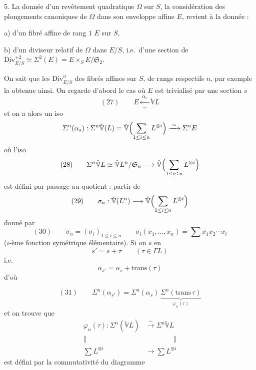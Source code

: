 \documentclass[11pt,a4paper]{article}
\begin{document}
5. La donnée d'un revêtement quadratique $\Omega$ sur $S$,  la considération des plongements canoniques de $\Omega$ dans son enveloppe affine $E$, revient à la donnée :

a) d'un fibré affine de rang $1$ $E$ sur $S$,

b) d'un diviseur relatif de $\Omega$ dans $E/S$, i.e.\ d'une section de $\underline{\mathrm{Div}}^{+2}_{E/S} \simeq \Sigma^2(E) = E \times_S E/\mathfrak{S}_2$.

On sait que \struck{\ill{}} les $\underline{\mathrm{Div}}^{n}_{E/S}$   des fibrés affines sur $S$, de rangs respectifs $n$,  par exemple la  obtenue ainsi. On regarde d'abord le cas où $E$ est trivialisé par une section $s$
\[
(27)\qquad E \xleftarrow[\sim]{\;\alpha_s\;} \check{\mathbb{V}}L
\]
et on a alors un iso
\[
\Sigma^n(\alpha_s) : \Sigma^n \check{\mathbb{V}}(L) = \check{\mathbb{V}}\Bigl(\sum_{1 \le i \le n} L^{\otimes i}\Bigr) \xrightarrow{\;\sim\;} \Sigma^n E
\]
où l'iso
\[
(28)\qquad \Sigma^n \check{\mathbb{V}}L \simeq \check{\mathbb{V}}L^n/\mathfrak{S}_n \longrightarrow \check{\mathbb{V}}\Bigl(\sum_{1 \le i \le n} L^{\otimes i}\Bigr)
\]
est défini par passage au quotient : partir de
\[
(29)\qquad \sigma_n : \check{\mathbb{V}}(L^n) \longrightarrow \check{\mathbb{V}}\Bigl(\sum_{1 \le i \le n} L^{\otimes i}\Bigr)
\]
donné par
\[
(30)\qquad \sigma_n = (\sigma_i)_{1 \le i \le n} \qquad \sigma_i(x_1, \ldots, x_n) = \sum x_1 x_2 \cdots x_i
\]
($i$-ème fonction symétrique élémentaire). Si on  $s$ en
\[
s' = s + \tau \qquad (\tau \in \Gamma L)
\]
i.e.
\[
\alpha_{s'} = \alpha_s + \mathrm{trans}(\tau)
\]
d'où

\[
(31)\qquad \Sigma^n(\alpha_{s'}) = \Sigma^n(\alpha_s)\,\underbrace{\Sigma^n(\mathrm{trans}\,\tau)}_{\varphi_n(\tau)}
\]
et on trouve que
\[
\begin{aligned}
\varphi_n(\tau) : \Sigma^n(\check{\mathbb{V}}L) &\xrightarrow{\;\sim\;} \Sigma^n \check{\mathbb{V}}L\\
\Vert\qquad&\qquad\qquad \Vert\\
\textstyle\sum L^{\otimes i} &\longrightarrow \textstyle\sum L^{\otimes i}
\end{aligned}
\]
est défini par la commutativité du \struck{\ill{}} diagramme

\end{document}
